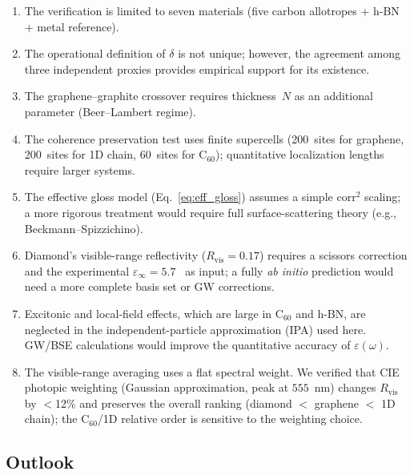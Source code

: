 \documentclass[twocolumn,showpacs,preprintnumbers,amsmath,amssymb,prb]{revtex4-2}
\begin{document}
\begin{enumerate}
  \item The verification is limited to seven materials (five carbon
    allotropes + h-BN + metal reference).
  \item The operational definition of $\delta$ is not unique; however,
    the agreement among three independent proxies provides empirical
    support for its existence.
  \item The graphene--graphite crossover requires thickness~$N$ as
    an additional parameter (Beer--Lambert regime).
  \item The coherence preservation test uses finite supercells
    (200~sites for graphene, 200~sites for 1D chain, 60~sites for
    C$_{60}$); quantitative localization lengths require larger systems.
  \item The effective gloss model (Eq.~\ref{eq:eff_gloss}) assumes a
    simple $\mathrm{corr}^2$ scaling; a more rigorous treatment would
    require full surface-scattering theory (e.g., Beckmann--Spizzichino).
  \item Diamond's visible-range reflectivity ($R_\mathrm{vis} = 0.17$)
    requires a scissors correction and the experimental
    $\varepsilon_\infty = 5.7$~\cite{Palik1998} as input; a fully \emph{ab initio} prediction
    would need a more complete basis set or GW corrections.
  \item Excitonic and local-field effects, which are large in C$_{60}$
    and h-BN, are neglected in the independent-particle approximation (IPA)
    used here. GW/BSE calculations would improve the quantitative accuracy
    of $\varepsilon(\omega)$.
  \item The visible-range averaging uses a flat spectral weight. We
    verified that CIE photopic weighting (Gaussian approximation,
    peak at $555$~nm) changes $R_\mathrm{vis}$ by $<$12\% and preserves
    the overall ranking (diamond $<$ graphene $<$ 1D chain); the
    C$_{60}$/1D relative order is sensitive to the weighting choice.
\end{enumerate}

\subsection{Outlook}
\end{document}
